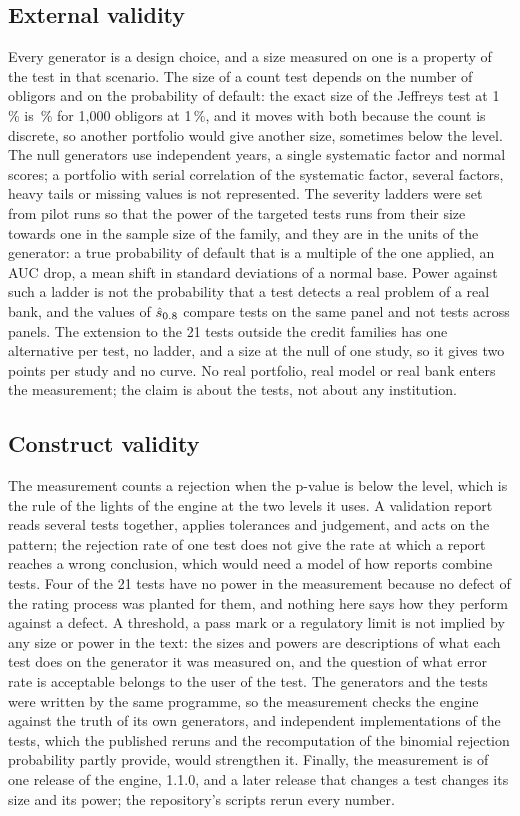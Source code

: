 \subsection{External validity}
\label{sec:li-external}

Every generator is a design choice, and a size measured on one is a property of the test in that scenario.
The size of a count test depends on the number of obligors and on the probability of default: the exact size of the Jeffreys test at 1\,\% is \jeffExactOne\,\% for 1,000 obligors at 1\,\%, and it moves with both because the count is discrete, so another portfolio would give another size, sometimes below the level.
The null generators use independent years, a single systematic factor and normal scores; a portfolio with serial correlation of the systematic factor, several factors, heavy tails or missing values is not represented.
The severity ladders were set from pilot runs so that the power of the targeted tests runs from their size towards one in the sample size of the family, and they are in the units of the generator: a true probability of default that is a multiple of the one applied, an AUC drop, a mean shift in standard deviations of a normal base.
Power against such a ladder is not the probability that a test detects a real problem of a real bank, and the values of $\hat{s}_{0.8}$ compare tests on the same panel and not tests across panels.
The extension to the 21 tests outside the credit families has one alternative per test, no ladder, and a size at the null of one study, so it gives two points per study and no curve.
No real portfolio, real model or real bank enters the measurement; the claim is about the tests, not about any institution.

\subsection{Construct validity}
\label{sec:li-construct}

The measurement counts a rejection when the p-value is below the level, which is the rule of the lights of the engine at the two levels it uses.
A validation report reads several tests together, applies tolerances and judgement, and acts on the pattern; the rejection rate of one test does not give the rate at which a report reaches a wrong conclusion, which would need a model of how reports combine tests.
Four of the 21 tests have no power in the measurement because no defect of the rating process was planted for them, and nothing here says how they perform against a defect.
A threshold, a pass mark or a regulatory limit is not implied by any size or power in the text: the sizes and powers are descriptions of what each test does on the generator it was measured on, and the question of what error rate is acceptable belongs to the user of the test.
The generators and the tests were written by the same programme, so the measurement checks the engine against the truth of its own generators, and independent implementations of the tests, which the published reruns and the recomputation of the binomial rejection probability partly provide, would strengthen it.
Finally, the measurement is of one release of the engine, 1.1.0, and a later release that changes a test changes its size and its power; the repository's scripts rerun every number.

